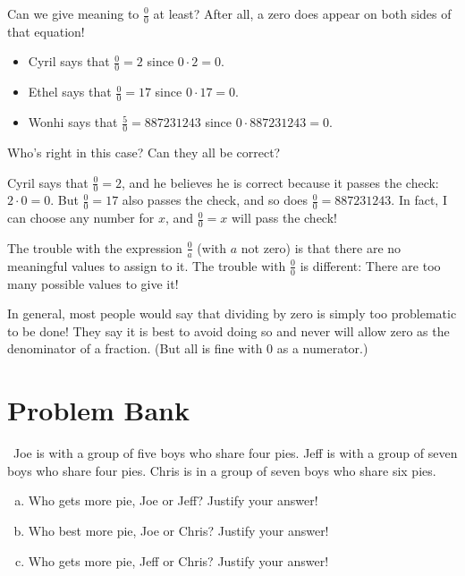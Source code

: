 Can we give meaning to $\frac 0 0$ at least?  After all, a zero does appear on both sides of that equation!
\begin{itemize}
\item
Cyril says that $\frac 0 0  = 2$ since $0 \cdot 2 = 0$.\\

\item
Ethel says that $\frac 0 0 = 17$ since $0 \cdot 17 = 0$.\\


\item
Wonhi says that $\frac 5 0  = 887231243$ since $0 \cdot 887231243 = 0$.\\

\end{itemize}

Who's right in this case?  Can they all be correct?  

 Cyril says that $\frac 0 0 = 2$, and
 he believes he is correct because it
passes the check: $2 \cdot 0 = 0$.
 But $\frac 0 0 = 17$ also passes the check, and so does $\frac 0 0 = 887231243$.  In fact, I can choose any number for $x$, and $\frac 0 0 = x$ will pass the check!
 
 The trouble with the expression $\frac 0 a$
(with $a$ not zero) is that there are no meaningful values to
assign to it. 
 The trouble with $\frac 0 0$ is different:
There are too many possible values to
give it!
 
In general, most people would say that dividing by zero is simply too problematic to
be done! They say it is best to avoid doing so and never will allow zero as the
denominator of a fraction. (But all is fine with 0 as a numerator.)




\section{Problem Bank}

\begin{problem}\ 
Joe is with a group of five boys who share four pies.  Jeff is with a group of seven boys who share four pies.  Chris is in a group of seven boys who share six pies.
\begin{enumerate}[(a)]
\item
  Who gets more pie, Joe or Jeff?  Justify your answer!
\item
Who best more pie, Joe or Chris?  Justify your answer!
\item
Who gets more pie, Jeff or Chris?  Justify your answer!
\end{enumerate}
\end{problem}


